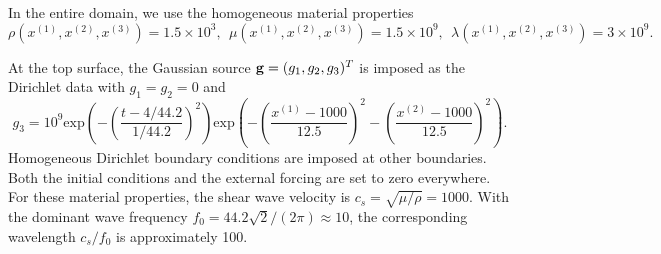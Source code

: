 In the entire domain, we use the homogeneous material properties
\begin{equation*}
\rho(x^{(1)},x^{(2)},x^{(3)}) = 1.5\times 10^3,\ \  \mu(x^{(1)},x^{(2)},x^{(3)}) = 1.5\times 10^9,\ \ 
\lambda(x^{(1)},x^{(2)},x^{(3)})  = 3\times 10^9.
\end{equation*}

At the top surface, the Gaussian source 
${\bf g} = (g_1,g_2,g_3)^T$ is imposed as the Dirichlet data with $g_1 = g_2 = 0$ and 
\[g_3 = 10^9 \text{exp}\left(-\left(\frac{t-4/44.2}{1/44.2}\right)^2\right)\text{exp}\left(-\left(\frac{x^{(1)}-1000}{12.5}\right)^2-\left(\frac{x^{(2)}-1000}{12.5}\right)^2\right).\]  
Homogeneous Dirichlet boundary conditions are imposed at other boundaries. Both the initial conditions and the external forcing are set to zero everywhere. %
For these material properties, the shear wave velocity is $c_s = \sqrt{\mu/\rho}=1000$. With the dominant wave frequency $f_0=44.2\sqrt{2}/(2\pi)\approx 10$, the corresponding wavelength $c_s/f_0$ is approximately 100.

